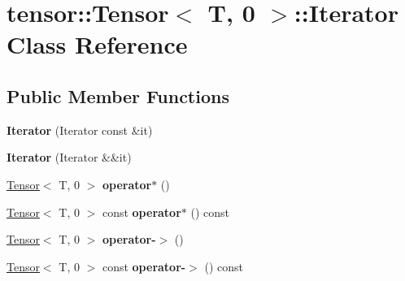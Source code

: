 \hypertarget{classtensor_1_1Tensor_3_01T_00_010_01_4_1_1Iterator}{}\section{tensor\+:\+:Tensor$<$ T, 0 $>$\+:\+:Iterator Class Reference}
\label{classtensor_1_1Tensor_3_01T_00_010_01_4_1_1Iterator}
\subsection*{Public Member Functions}
\begin{DoxyCompactItemize}
\item 
{\bfseries Iterator} (Iterator const \&it)\hypertarget{classtensor_1_1Tensor_3_01T_00_010_01_4_1_1Iterator_abba6d2294e977cbd38e547227e73ba13}{}\label{classtensor_1_1Tensor_3_01T_00_010_01_4_1_1Iterator_abba6d2294e977cbd38e547227e73ba13}

\item 
{\bfseries Iterator} (Iterator \&\&it)\hypertarget{classtensor_1_1Tensor_3_01T_00_010_01_4_1_1Iterator_ac9954848ac6df6a33f4e9bca69a44d04}{}\label{classtensor_1_1Tensor_3_01T_00_010_01_4_1_1Iterator_ac9954848ac6df6a33f4e9bca69a44d04}

\item 
\hyperlink{classtensor_1_1Tensor}{Tensor}$<$ T, 0 $>$ {\bfseries operator$\ast$} ()\hypertarget{classtensor_1_1Tensor_3_01T_00_010_01_4_1_1Iterator_aa82319b322948c99dd630ef2c0a02e76}{}\label{classtensor_1_1Tensor_3_01T_00_010_01_4_1_1Iterator_aa82319b322948c99dd630ef2c0a02e76}

\item 
\hyperlink{classtensor_1_1Tensor}{Tensor}$<$ T, 0 $>$ const {\bfseries operator$\ast$} () const \hypertarget{classtensor_1_1Tensor_3_01T_00_010_01_4_1_1Iterator_abb9ad7be79b8c5cbad19f23e05c14019}{}\label{classtensor_1_1Tensor_3_01T_00_010_01_4_1_1Iterator_abb9ad7be79b8c5cbad19f23e05c14019}

\item 
\hyperlink{classtensor_1_1Tensor}{Tensor}$<$ T, 0 $>$ {\bfseries operator-\/$>$} ()\hypertarget{classtensor_1_1Tensor_3_01T_00_010_01_4_1_1Iterator_ae335f6d6987e772e004a7b427c9fe964}{}\label{classtensor_1_1Tensor_3_01T_00_010_01_4_1_1Iterator_ae335f6d6987e772e004a7b427c9fe964}

\item 
\hyperlink{classtensor_1_1Tensor}{Tensor}$<$ T, 0 $>$ const {\bfseries operator-\/$>$} () const \hypertarget{classtensor_1_1Tensor_3_01T_00_010_01_4_1_1Iterator_a9a9d9c7949252c736e714eb7a2e5abff}{}\label{classtensor_1_1Tensor_3_01T_00_010_01_4_1_1Iterator_a9a9d9c7949252c736e714eb7a2e5abff}


\end{DoxyCompactItemize}
